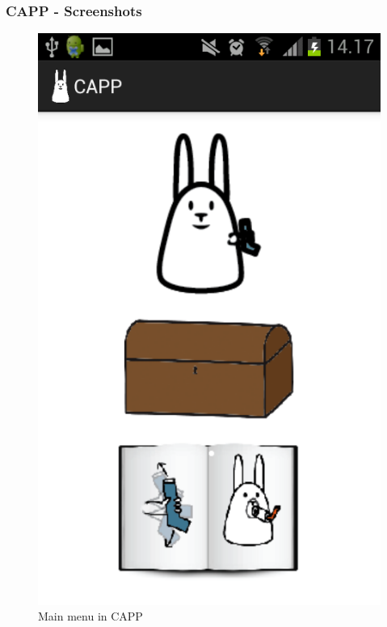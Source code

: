 \subsubsection{CAPP - Screenshots}
\label{sec:capp-screenshots}
\begin{figure}
	\begin{minipage}[b]{0.4\linewidth}
		\centering
		\includegraphics[width=0.20\paperwidth]{Pictures/Screenshots/capp_main_menu.png}
	\caption{Main menu in CAPP}
	\label{fig:capp-main-menu}
	\end{minipage}
	\hspace{3cm}
	\begin{minipage}[b]{0.4\linewidth}
		\centering

\end{minipage}
\end{figure}
